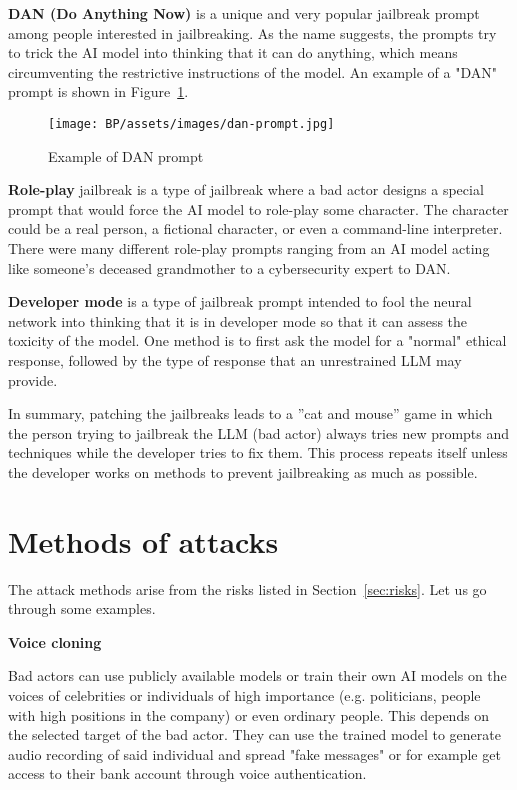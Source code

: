 \textbf{DAN (Do Anything Now)} is a unique and very popular jailbreak prompt among people interested in jailbreaking. As the name suggests, the prompts try to trick the AI model into thinking that it can do anything, which means circumventing the restrictive instructions of the model. An example of a "DAN" prompt is shown in Figure~\ref{fig:dan-prompt}.

\begin{figure}[ht]
\begin{centering}
\texttt{[image: BP/assets/images/dan-prompt.jpg]}
\par\end{centering}
\caption{Example of 
 DAN prompt\cite{reddit_pic}
 \label{fig:dan-prompt}}
\end{figure}


\textbf{Role-play} jailbreak is a type of jailbreak where a bad actor designs a special prompt that would force the AI model to role-play some character. The character could be a real person, a fictional character, or even a command-line interpreter. There were many different role-play prompts ranging from an AI model acting like someone's deceased grandmother to a cybersecurity expert to DAN.

\textbf{Developer mode} is a type of jailbreak prompt intended to fool the neural network into thinking that it is in developer mode so that it can assess the toxicity of the model. One method is to first ask the model for a "normal" ethical response, followed by the type of response that an unrestrained LLM may provide.

In summary, patching the jailbreaks leads to a ''cat and mouse'' game in which the person trying to jailbreak the LLM (bad actor) always tries new prompts and techniques while the developer tries to fix them. This process repeats itself unless the developer works on methods to prevent jailbreaking as much as possible.

\section{Methods of attacks\label{sec:methods_of_attacks}}
The attack methods arise from the risks listed in Section~\ref{sec:risks}. Let us go through some examples.

\textbf{Voice cloning}

Bad actors can use publicly available models or train their own AI models on the voices of celebrities or individuals of high importance (e.g. politicians, people with high positions in the company) or even ordinary people. This depends on the selected target of the bad actor. They can use the trained model to generate audio recording of said individual and spread "fake messages" or for example get access to their bank account through voice authentication.

